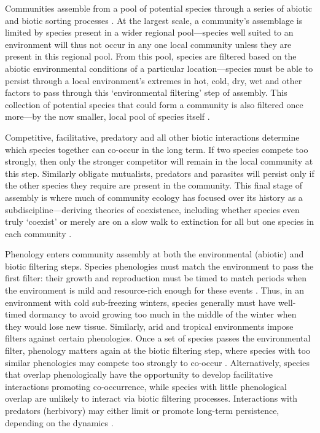 \documentclass[11pt]{article}
\begin{document}
Communities assemble from a pool of potential species through a series of abiotic and biotic sorting processes \citep{hillerislambers2012rethinking}. At the largest scale, a community's assemblage is limited by species present in a wider regional pool---species well suited to an environment will thus not occur in any one local community unless they are present in this regional pool. From this pool, species are filtered based on the abiotic environmental conditions of a particular location---species must be able to persist through a local environment's extremes in hot, cold, dry, wet and other factors to pass through this `environmental filtering' step of assembly. This collection of potential species that could form a community is also filtered once more---by the now smaller, local pool of species itself \citep{hillerislambers2012rethinking}. 

Competitive, facilitative, predatory and all other biotic interactions determine which species together can co-occur in the long term. If two species compete too strongly, then only the stronger competitor will remain in the local community at this step. Similarly obligate mutualists, predators and parasites will persist only if the other species they require are present in the community. This final stage of assembly is where much of community ecology has focused over its history as a subdiscipline---deriving theories of coexistence, including whether species even truly `coexist' or merely are on a slow walk to extinction for all but one species in each community \citep{Hubbell:2001vo}. 

Phenology enters community assembly at both the environmental (abiotic) and biotic filtering steps. Species phenologies must match the environment to pass the first filter: their growth and reproduction must be timed to match periods when the environment is mild and resource-rich enough for these events \citep{rathcke1985phenological}. Thus, in an environment with cold sub-freezing winters, species generally must have well-timed dormancy to avoid growing too much in the middle of the winter when they would lose new tissue. Similarly, arid and tropical environments impose filters against certain phenologies. Once a set of species passes the environmental filter, phenology matters again at the biotic filtering step, where species with too similar phenologies may compete too strongly to co-occur \citep{gause1932experimental, abrams1983theory}.   Alternatively, species that overlap phenologically have the opportunity to develop facilitative interactions \citep{duchenne2021phenological} promoting co-occurrence, while species with little phenological overlap are unlikely to interact via biotic filtering processes. Interactions with predators (herbivory) may either limit or promote long-term persistence, depending on the dynamics \citep[such dynamics relate in part to a larger literature on trophic synchrony, for which we refer readers to a number of recent reviews, e.g.][]{kharouba2018global}.
\end{document}
